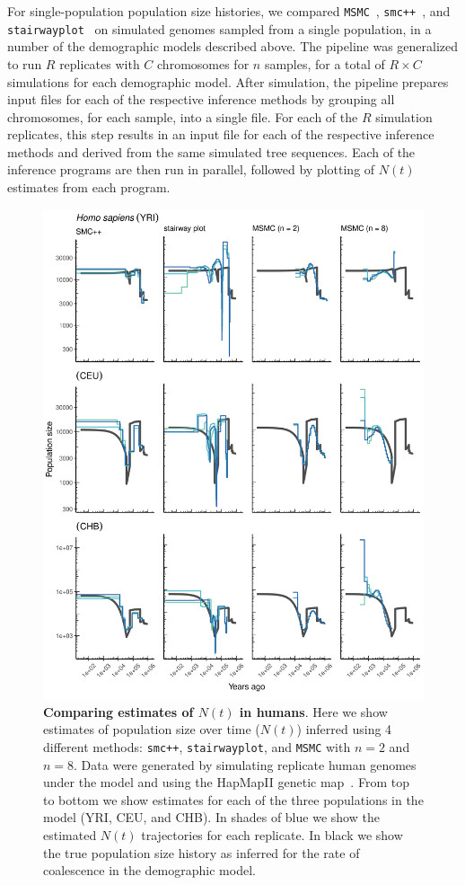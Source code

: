 \documentclass[12pt,halfline,a4paper]{ouparticle}
\newcommand{\MSMC}{\texttt{MSMC}\xspace}
\newcommand{\smcpp}{\texttt{smc++}\xspace}
\newcommand{\stairwayplot}{\texttt{stairwayplot}\xspace}
\begin{document}
For single-population population size histories, we compared
\MSMC~\citep{schiffels2014inferring}, \smcpp~\citep{terhorst2017robust}, and
\stairwayplot~\citep{liu2015exploring}
 on simulated genomes sampled from a single population,
in a number of the demographic models described above. The pipeline was generalized to
run $R$ replicates with $C$ chromosomes for $n$ samples, for a total of $R \times C$
simulations for each demographic model. After simulation, the pipeline prepares
input files for each of the respective inference methods by grouping all
chromosomes, for each sample, into a single file. For each of the $R$ simulation replicates, this step results in an
input file for each of the
respective inference methods and derived from the same simulated tree sequences.
Each of the inference programs are then run in parallel, followed by plotting of
$N(t)$ estimates from each program.

\begin{figure}
\begin{center}
\includegraphics[width=0.8\linewidth]{display_items/homo_sapiens_mask_Ragsdale.png}
\caption{\textbf{Comparing estimates of $N(t)$ in humans}. Here we show estimates of population
size over time ($N(t)$) inferred using 4 different methods: \smcpp, \texttt{stairwayplot}, and
\MSMC with $n=2$ and $n=8$. Data were generated by simulating
replicate human genomes under the \cite{ragsdale2019models} model and using the
HapMapII genetic map~\citep{international2007second}. From top to bottom we show estimates for each
of the three populations in the model (YRI, CEU, and CHB). In shades of blue we show the estimated
$N(t)$ trajectories for each replicate. In black we show the true population size history as inferred
for the rate of coalescence in the demographic model.}
\label{fig:n_t_ragsdale}
\end{center}
\end{figure}
\end{document}

